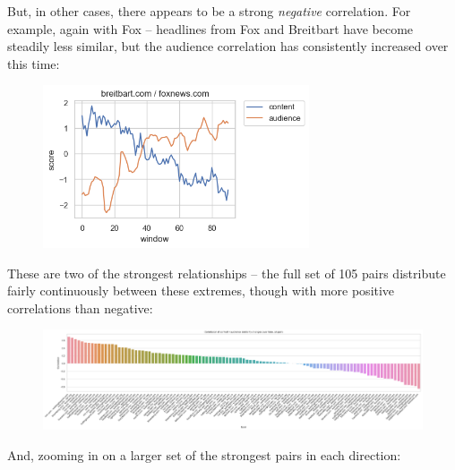 \documentclass{scrartcl}
\begin{document}
But, in other cases, there appears to be a strong \textit{negative} correlation. For example, again with Fox -- headlines from Fox and Breitbart have become steadily less similar, but the audience correlation has consistently increased over this time:

\begin{figure}[H]
  \centering
  \includegraphics[width=0.7\textwidth]{figures/breitbart-fox-corr.png}
\end{figure}

These are two of the strongest relationships -- the full set of 105 pairs distribute fairly continuously between these extremes, though with more positive correlations than negative:

\begin{figure}[H]
  \centering
  \includegraphics[width=\textwidth]{figures/ts-ca-corrs.png}
\end{figure}

And, zooming in on a larger set of the strongest pairs in each direction:
\end{document}
